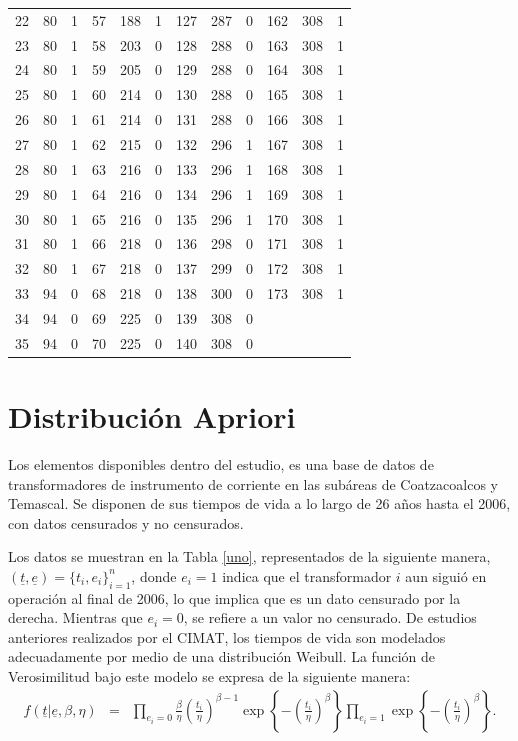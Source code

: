 \begin{table}[h!]
\begin{center}
\begin{tabular}{ccc|ccc|ccc|ccc}
22	&	80	&	1	&	57	&	188	&	1	&	127	&	287	&	0	&	162	&	308	&	1	\\
23	&	80	&	1	&	58	&	203	&	0	&	128	&	288	&	0	&	163	&	308	&	1	\\
24	&	80	&	1	&	59	&	205	&	0	&	129	&	288	&	0	&	164	&	308	&	1	\\
25	&	80	&	1	&	60	&	214	&	0	&	130	&	288	&	0	&	165	&	308	&	1	\\
26	&	80	&	1	&	61	&	214	&	0	&	131	&	288	&	0	&	166	&	308	&	1	\\
27	&	80	&	1	&	62	&	215	&	0	&	132	&	296	&	1	&	167	&	308	&	1	\\
28	&	80	&	1	&	63	&	216	&	0	&	133	&	296	&	1	&	168	&	308	&	1	\\
29	&	80	&	1	&	64	&	216	&	0	&	134	&	296	&	1	&	169	&	308	&	1	\\
30	&	80	&	1	&	65	&	216	&	0	&	135	&	296	&	1	&	170	&	308	&	1	\\
31	&	80	&	1	&	66	&	218	&	0	&	136	&	298	&	0	&	171	&	308	&	1	\\
32	&	80	&	1	&	67	&	218	&	0	&	137	&	299	&	0	&	172	&	308	&	1	\\
33	&	94	&	0	&	68	&	218	&	0	&	138	&	300	&	0	&	173	&	308	&	1	\\
34	&	94	&	0	&	69	&	225	&	0	&	139	&	308	&	0	&		&		&		\\
35	&	94	&	0	&	70	&	225	&	0	&	140	&	308	&	0	&		&		&		\\
\bottomrule[0.6mm]
\end{tabular}
\end{center}
\end{table}


\section{Distribuci\'on Apriori}
\noindent Los elementos disponibles dentro del estudio, 
es una base de datos de transformadores de instrumento de corriente en las sub\'areas de  
Coatzacoalcos y Temascal. Se disponen de sus tiempos de vida  a lo largo de 26 a\~nos hasta el 2006, con datos censurados y no 
censurados. 

\noindent Los datos se muestran en la Tabla \ref{uno}, representados de la siguiente manera, 
$(\underline{t},\underline{e})=\{t_i,e_i\}^n_{i=1}$, donde $e_i=1$ indica que 
el transformador $i$ aun sigui\'o en 
operaci\'on al final de 2006, lo que implica que  es un dato censurado por la derecha. Mientras que $e_i=0$, se refiere a un valor no censurado. De estudios 
anteriores realizados por el CIMAT, los tiempos de vida son modelados adecuadamente 
por medio de una 
distribuci\'on Weibull. La funci\'on de Verosimilitud bajo 
este modelo se expresa 
de la siguiente manera:
\begin{eqnarray}\label{tiempos}
f(\underline{t}|\underline{e},\beta,\eta)&=& \prod_{e_i=0}\frac{\beta}{\eta}\left(\frac{t_i}{\eta}\right)^{\beta-1}\exp \left\{-\left(\frac{t_i}{\eta}\right)^{\beta}\right\}\prod_{e_i=1}\exp\left\{-\left(\frac{t_i}{\eta}\right)^{\beta}\right\}.
\end{eqnarray}

